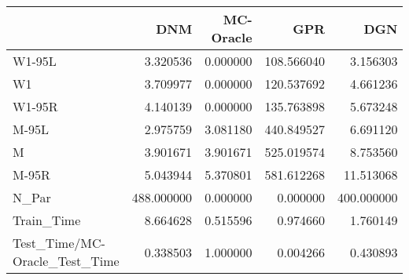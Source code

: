 \begin{tabular}{lrrrr}
\toprule
{} &         DNM &  MC-Oracle &         GPR &         DGN \\
\midrule
W1-95L                        &    3.320536 &   0.000000 &  108.566040 &    3.156303 \\
W1                            &    3.709977 &   0.000000 &  120.537692 &    4.661236 \\
W1-95R                        &    4.140139 &   0.000000 &  135.763898 &    5.673248 \\
M-95L                         &    2.975759 &   3.081180 &  440.849527 &    6.691120 \\
M                             &    3.901671 &   3.901671 &  525.019574 &    8.753560 \\
M-95R                         &    5.043944 &   5.370801 &  581.612268 &   11.513068 \\
N\_Par                         &  488.000000 &   0.000000 &    0.000000 &  400.000000 \\
Train\_Time                    &    8.664628 &   0.515596 &    0.974660 &    1.760149 \\
Test\_Time/MC-Oracle\_Test\_Time &    0.338503 &   1.000000 &    0.004266 &    0.430893 \\
\bottomrule
\end{tabular}
